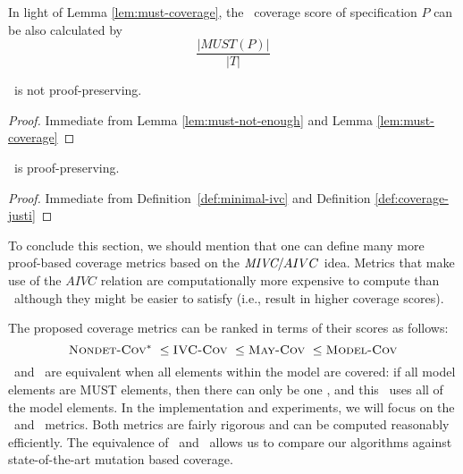 In light of Lemma \ref{lem:must-coverage}, the \nondetcovalt\ coverage score of specification $P$ can be also calculated by
$$\frac{|MUST(P)|}{|T|}$$


%
\begin{coroll}
\label{cor:must-not-provable}
\nondetcovalt\ is not proof-preserving.
\end{coroll}
\begin{proof}
Immediate from Lemma \ref{lem:must-not-enough} and Lemma \ref{lem:must-coverage}
\end{proof}
\vspace{2mm}
\begin{coroll}
\label{cor:ivc-provable}
\ivccov\ is proof-preserving.
\end{coroll}
\begin{proof}
Immediate from Definition~\ref{def:minimal-ivc} and Definition \ref{def:coverage-justi}
\end{proof}
\vspace{2mm}


To conclude this section, we should mention that one can define many more proof-based coverage metrics based on the $\textit{MIVC} /AIVC$ idea. Metrics that make use of the $AIVC$ relation are computationally more expensive to compute than \ivccov\ although they might be easier to satisfy (i.e., result in higher coverage scores).

The proposed coverage metrics can be ranked in terms of their scores as follows:
$$\nondetcovalt\ \leq \ivccov\ \leq \maycov\ \leq \allcov$$
\ivccov\ and \nondetcovalt\ are equivalent when all elements within the model are covered: if all model elements are MUST elements, then there can only be one \mivc , and this \mivc ~uses all of the model elements.   In the implementation and experiments, we will focus on the \ivccov\ and \nondetcovalt\ metrics.  Both metrics are fairly rigorous and can be computed reasonably efficiently.  The equivalence of \mustcov\ and \nondetcovalt\ allows us to compare our algorithms against state-of-the-art mutation based coverage.


